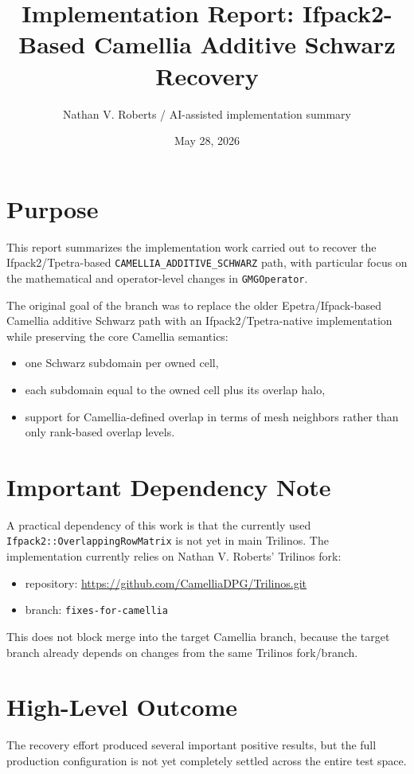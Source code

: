 \documentclass[11pt]{article}
\title{Implementation Report: Ifpack2-Based Camellia Additive Schwarz Recovery}
\author{Nathan V. Roberts / AI-assisted implementation summary}
\date{May 28, 2026}
\begin{document}
\maketitle

\section{Purpose}
This report summarizes the implementation work carried out to recover the Ifpack2/Tpetra-based \texttt{CAMELLIA\_ADDITIVE\_SCHWARZ} path, with particular focus on the mathematical and operator-level changes in \texttt{GMGOperator}.

The original goal of the branch was to replace the older Epetra/Ifpack-based Camellia additive Schwarz path with an Ifpack2/Tpetra-native implementation while preserving the core Camellia semantics:
\begin{itemize}
  \item one Schwarz subdomain per owned cell,
  \item each subdomain equal to the owned cell plus its overlap halo,
  \item support for Camellia-defined overlap in terms of mesh neighbors rather than only rank-based overlap levels.
\end{itemize}

\section{Important Dependency Note}
A practical dependency of this work is that the currently used \texttt{Ifpack2::OverlappingRowMatrix} is not yet in main Trilinos. The implementation currently relies on Nathan V. Roberts' Trilinos fork:
\begin{itemize}
  \item repository: \url{https://github.com/CamelliaDPG/Trilinos.git}
  \item branch: \texttt{fixes-for-camellia}
\end{itemize}
This does not block merge into the target Camellia branch, because the target branch already depends on changes from the same Trilinos fork/branch.

\section{High-Level Outcome}
The recovery effort produced several important positive results, but the full production configuration is not yet completely settled across the entire test space.
\end{document}

